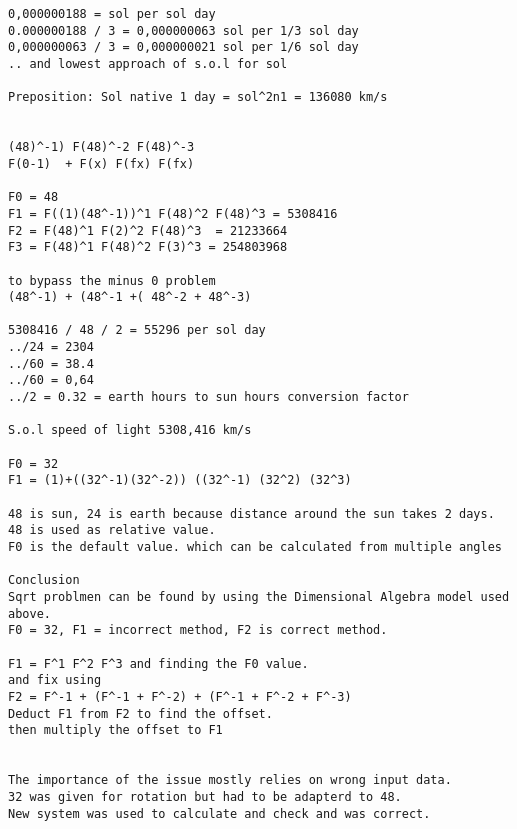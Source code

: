 \documentclass{thesis}
\begin{document}
\begin{verbatim}
0,000000188 = sol per sol day
0.000000188 / 3 = 0,000000063 sol per 1/3 sol day
0,000000063 / 3 = 0,000000021 sol per 1/6 sol day 
.. and lowest approach of s.o.l for sol

Preposition: Sol native 1 day = sol^2n1 = 136080 km/s   


(48)^-1) F(48)^-2 F(48)^-3 
F(0-1)  + F(x) F(fx) F(fx)

F0 = 48
F1 = F((1)(48^-1))^1 F(48)^2 F(48)^3 = 5308416
F2 = F(48)^1 F(2)^2 F(48)^3  = 21233664
F3 = F(48)^1 F(48)^2 F(3)^3 = 254803968

to bypass the minus 0 problem
(48^-1) + (48^-1 +( 48^-2 + 48^-3)

5308416 / 48 / 2 = 55296 per sol day
../24 = 2304
../60 = 38.4
../60 = 0,64
../2 = 0.32 = earth hours to sun hours conversion factor

S.o.l speed of light 5308,416 km/s

F0 = 32
F1 = (1)+((32^-1)(32^-2)) ((32^-1) (32^2) (32^3)

48 is sun, 24 is earth because distance around the sun takes 2 days.
48 is used as relative value. 
F0 is the default value. which can be calculated from multiple angles

Conclusion
Sqrt problmen can be found by using the Dimensional Algebra model used above.
F0 = 32, F1 = incorrect method, F2 is correct method. 

F1 = F^1 F^2 F^3 and finding the F0 value.
and fix using
F2 = F^-1 + (F^-1 + F^-2) + (F^-1 + F^-2 + F^-3)
Deduct F1 from F2 to find the offset. 
then multiply the offset to F1


The importance of the issue mostly relies on wrong input data.
32 was given for rotation but had to be adapterd to 48.
New system was used to calculate and check and was correct.

\end{verbatim}
\end{document}
